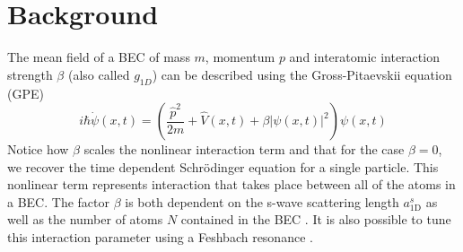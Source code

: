 \documentclass[a4paper, twocolumn]{revtex4-1}
\begin{document}
\section{\label{sec:back}Background}
The mean field of a BEC of mass $m$, momentum $p$ and interatomic interaction strength $\beta$ (also called $g_{1D}$) can be described using the Gross-Pitaevskii equation (GPE)
\begin{equation}
	i\hbar \dot{\psi}(x,t)= \left( \frac{\hat{p}^2}{2m} + \hat{V}(x,t) + \beta |\psi(x,t)|^2 \right)\psi(x,t)
	\label{eq:Hbec}
\end{equation}
Notice how $\beta$ scales the nonlinear interaction term and that for the case $\beta=0$, we recover the time dependent Schrödinger equation for a single particle. This nonlinear term represents interaction that takes place between all of the atoms in a BEC. The factor $\beta$ is both dependent on the s-wave scattering length $a_{\text{1D}}^s$ as well as the number of atoms  $N$ contained in the BEC \cite{Schmiedmayer}. It is also possible to tune this interaction parameter using a Feshbach resonance \cite{Feshbach}. \\ 
\end{document}

